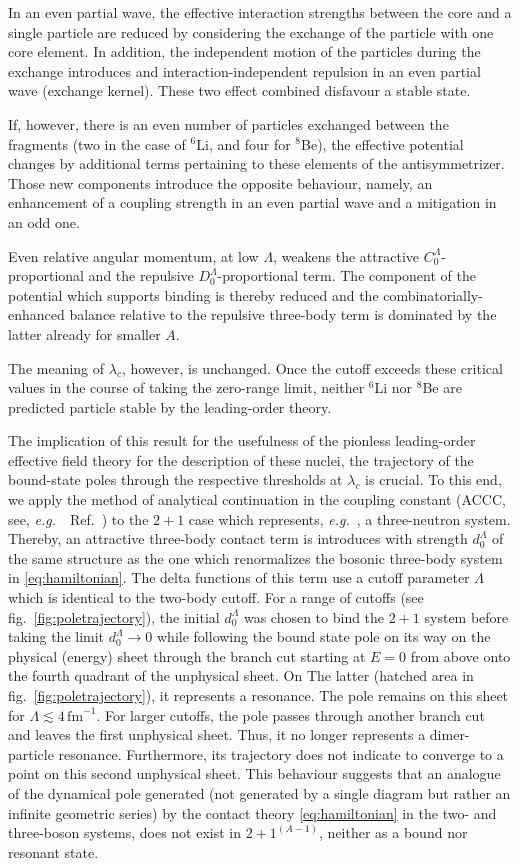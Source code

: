 \documentclass[preprint,12pt]{elsarticle}
\newcommand{\lc}{\ensuremath{\lambda_c}}
\newcommand{\fm}{\ensuremath{\,\text{fm}^{-1}}}
\newcommand{\abb}{\ensuremath{2\!+\!1^{(A-1)}}}
\newcommand{\eg}{\textit{e.g.}~}
\newcommand{\figref}[1]{fig.~\ref{#1}}
\begin{document}
In an even partial wave, the effective interaction strengths between the core and a single particle are reduced
by considering the exchange of the particle with one core element. In addition, the independent motion of the particles
during the exchange introduces and interaction-independent repulsion in an even partial wave (exchange kernel).
These two effect combined disfavour a stable state.

If, however, there is an even number of particles exchanged between the fragments (two in the case of $^6$Li, and
four for $^8$Be), the effective potential changes by additional terms pertaining to these elements of the
antisymmetrizer. Those new components introduce the opposite behaviour, namely, an enhancement of a coupling strength
in an even partial wave and a mitigation in an odd one.

Even relative angular momentum, at low $\Lambda$, weakens the attractive $C_0^\Lambda$-proportional
and the repulsive $D_0^\Lambda$-proportional term.
The component of the potential which supports binding is thereby reduced and the combinatorially-enhanced
balance relative to the repulsive three-body term is dominated by the latter already for smaller $A$.

The meaning of $\lc$, however, is unchanged.
Once the cutoff exceeds these critical values in the course of taking the
zero-range limit, neither $^6$Li nor $^8$Be are predicted particle stable
by the leading-order theory.

The implication of this result for the usefulness of the pionless leading-order effective field theory for
the description of these nuclei, the trajectory of the bound-state poles through the respective thresholds at $\lc$
is crucial.
To this end, we apply the method of analytical continuation in the coupling
constant (ACCC, see, \eg~Ref.~\cite{Kukulin_1977}) to the $2+1$ case which represents, \eg, a three-neutron system.
Thereby, an attractive three-body contact term is introduces with strength $d_0^\Lambda$ of the same structure as the one
which renormalizes the bosonic three-body system in \eqref{eq:hamiltonian}. The delta functions of this term use a
cutoff parameter $\Lambda$ which is identical to the two-body cutoff. For a range of cutoffs
(see \figref{fig:poletrajectory}), the initial $d_0^\Lambda$ was chosen to bind the $2+1$ system before taking
the limit $d_0^\Lambda\to 0$ while following the bound state pole on its way on the physical (energy) sheet through
the branch cut starting at $E=0$ from above onto the fourth quadrant of the unphysical sheet. On The latter (hatched
area in \figref{fig:poletrajectory}), it represents a resonance. The pole remains on this sheet for
$\Lambda\lesssim4\fm$. For larger cutoffs, the pole passes through another branch cut and leaves the first
unphysical sheet. Thus, it no longer represents a dimer-particle resonance. Furthermore, its trajectory does not
indicate to converge to a point on this second unphysical sheet. This behaviour suggests that an analogue of the dynamical
pole generated (not generated by a single diagram but rather an infinite geometric series) by the
contact theory \eqref{eq:hamiltonian} in the two- and three-boson systems, does not
exist in \abb, neither as a bound nor resonant state.
\end{document}
